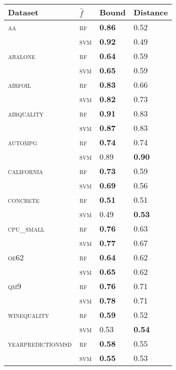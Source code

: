 \begin{tabular}{llll}
  \toprule
Dataset & $\hat f$ & Bound & Distance \\ 
  \midrule
\textsc{aa} & \textsc{rf} & \textbf{0.86} & 0.52 \\ 
   & \textsc{svm} & \textbf{0.92} & 0.49 \\ 
  \textsc{abalone} & \textsc{rf} & \textbf{0.64} & 0.59 \\ 
   & \textsc{svm} & \textbf{0.65} & 0.59 \\ 
  \textsc{airfoil} & \textsc{rf} & \textbf{0.83} & 0.66 \\ 
   & \textsc{svm} & \textbf{0.82} & 0.73 \\ 
  \textsc{airquality} & \textsc{rf} & \textbf{0.91} & 0.83 \\ 
   & \textsc{svm} & \textbf{0.87} & 0.83 \\ 
  \textsc{autompg} & \textsc{rf} & \textbf{0.74} & 0.74 \\ 
   & \textsc{svm} & 0.89 & \textbf{0.90} \\ 
  \textsc{california} & \textsc{rf} & \textbf{0.73} & 0.59 \\ 
   & \textsc{svm} & \textbf{0.69} & 0.56 \\ 
  \textsc{concrete} & \textsc{rf} & \textbf{0.51} & 0.51 \\ 
   & \textsc{svm} & 0.49 & \textbf{0.53} \\ 
  \textsc{cpu\_small} & \textsc{rf} & \textbf{0.76} & 0.63 \\ 
   & \textsc{svm} & \textbf{0.77} & 0.67 \\ 
  \textsc{oe62} & \textsc{rf} & \textbf{0.64} & 0.62 \\ 
   & \textsc{svm} & \textbf{0.65} & 0.62 \\ 
  \textsc{qm9} & \textsc{rf} & \textbf{0.76} & 0.71 \\ 
   & \textsc{svm} & \textbf{0.78} & 0.71 \\ 
  \textsc{winequality} & \textsc{rf} & \textbf{0.59} & 0.52 \\ 
   & \textsc{svm} & 0.53 & \textbf{0.54} \\ 
  \textsc{yearpredictionmsd} & \textsc{rf} & \textbf{0.58} & 0.55 \\ 
   & \textsc{svm} & \textbf{0.55} & 0.53 \\ 
   \bottomrule
\end{tabular}
